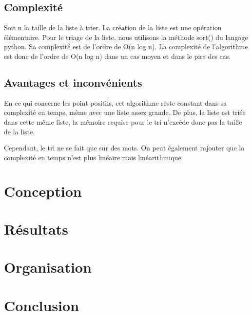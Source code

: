 \documentclass[12pt]{article}
\begin{document}
\subsection{Complexité}
\hspace{1.0 cm} Soit n la taille de la liste à trier. La  création de la liste est une opération élémentaire. Pour le triage de la liste, nous utilisons la méthode sort() du langage python. Sa complexité est de l'ordre de O(n log n). La complexité de l'algorithme est donc de l'ordre de O(n log n) dans un cas moyen et dans le pire des cas.

\subsection{Avantages et inconvénients}
\hspace{1.0 cm} En ce qui concerne les point positifs, cet algorithme reste constant dans sa complexité en temps, même avec une liste assez grande. De plus, la liste est triée dans cette même liste, la mémoire requise pour le tri n'excède donc pas la taille de la liste.

Cependant, le tri ne se fait que sur des mots. On peut également rajouter que la complexité en temps n'est plus linéaire mais linéarithmique. 

\newpage






\section{Conception}
\newpage 

\section{Résultats}
\newpage 
\section{Organisation}
\newpage 
\section{Conclusion}

\newpage
%
%
\end{document}
